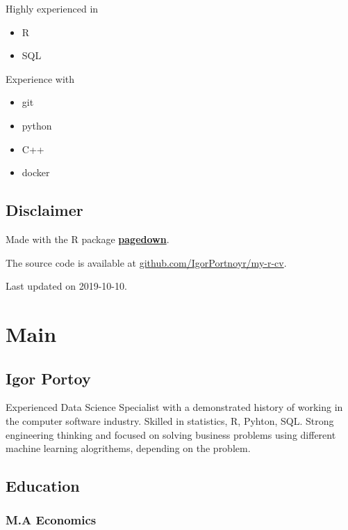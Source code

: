 \documentclass[]{article}
\providecommand{\tightlist}{%
  \setlength{\itemsep}{0pt}\setlength{\parskip}{0pt}}
\begin{document}
Highly experienced in

\begin{itemize}
\tightlist
\item
  R
\item
  SQL
\end{itemize}

Experience with

\begin{itemize}
\tightlist
\item
  git
\item
  python
\item
  C++
\item
  docker
\end{itemize}

\hypertarget{disclaimer}{%
\subsection{Disclaimer}\label{disclaimer}}

Made with the R package
\href{https://github.com/rstudio/pagedown}{\textbf{pagedown}}.

The source code is available at
\href{https://github.com/IgorPortnoy/my-r-cv}{github.com/IgorPortnoyr/my-r-cv}.

Last updated on 2019-10-10.

\hypertarget{main}{%
\section{Main}\label{main}}

\hypertarget{title}{%
\subsection{Igor Portoy}\label{title}}

Experienced Data Science Specialist with a demonstrated history of
working in the computer software industry. Skilled in statistics, R,
Pyhton, SQL. Strong engineering thinking and focused on solving business
problems using different machine learning alogrithems, depending on the
problem.

\hypertarget{education}{%
\subsection{Education}\label{education}}

\hypertarget{m.a-economics}{%
\subsubsection{M.A Economics}\label{m.a-economics}}
\end{document}
